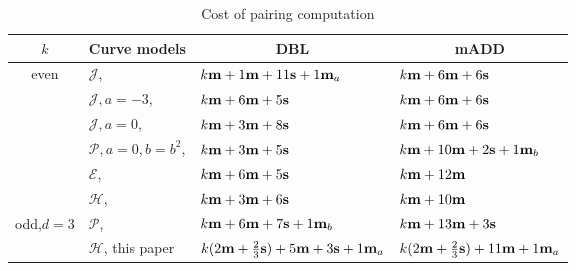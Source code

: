 \begin{table}[h]
\centering
\caption{Cost of pairing computation}

\begin{tabular}{ l | l | l | l}
\hline
\multicolumn{1}{c|}{$k$}
&\multicolumn{1}{c|}{Curve models}	&\multicolumn{1}{c|}{DBL}	&\multicolumn{1}{c}{mADD}	\\
\hline
\multicolumn{1}{c|}{\multirow{6}{*}{even}}
&$\mathcal{J}$, \cite{2008/IonicaJoux08} \cite{2009/fastertate}
				&$k\textbf{m} + 1\textbf{m} + 11\textbf{s} + 1\textbf{m}_{a}$	&$k\textbf{m} + 6\textbf{m} + 6\textbf{s}$	\\
&$\mathcal{J},a = -3$, \cite{2009/fastertate}
				&$k\textbf{m} + 6\textbf{m} + 5\textbf{s}$		&$k\textbf{m} + 6\textbf{m} + 6\textbf{s}$	\\
&$\mathcal{J},a = 0$, \cite{2009/fastertate}		
				&$k\textbf{m} + 3\textbf{m} + 8\textbf{s}$		&$k\textbf{m} + 6\textbf{m} + 6\textbf{s}$	\\
&$\mathcal{P},a = 0, b = b^2$, \cite{2009/craig}
				&$k\textbf{m} + 3\textbf{m} + 5\textbf{s}$		&$k\textbf{m} + 10\textbf{m} + 2\textbf{s} + 1\textbf{m}_{b}$	\\
&$\mathcal{E}$, \cite{2009/fastertate}			
				&$k\textbf{m} + 6\textbf{m} + 5\textbf{s}$		&$k\textbf{m} + 12\textbf{m}$	\\
&$\mathcal{H}$, \cite{2010/Gu}	&$k\textbf{m} + 3\textbf{m} + 6\textbf{s}$		&$k\textbf{m} + 10\textbf{m}$	\\
\hline
\multicolumn{1}{c|}{\multirow{2}{*}{odd,$d{=}3$}}
&$\mathcal{P}$, \cite{2010/CLN}	&$k\textbf{m} + 6\textbf{m} + 7\textbf{s} + 1\textbf{m}_b$	&$k\textbf{m} + 13\textbf{m} + 3\textbf{s}$	\\
&$\mathcal{H}$, this paper
				&$k(2\textbf{m} + \frac{2}{3}\textbf{s}) + 5\textbf{m} + 3\textbf{s} + 1\textbf{m}_a$
									&$k(2\textbf{m} + \frac{2}{3}\textbf{s}) + 11\textbf{m} + 1\textbf{m}_a$	\\
\hline
\end{tabular}
\label{tbl-cmp}


\end{table}


